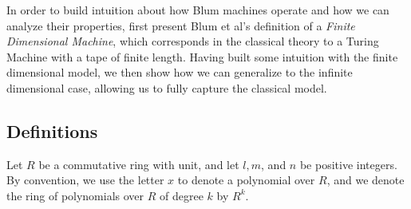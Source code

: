 \documentclass[twoside]{article}
\begin{document}
In order to build intuition about how Blum machines operate and how we
can analyze their properties, first present Blum et al's definition of
a \emph{Finite Dimensional Machine}, which corresponds in the
classical theory to a Turing Machine with a tape of finite length.
Having built some intuition with the finite dimensional model, we then
show how we can generalize to the infinite dimensional case, allowing
us to fully capture the classical model. 

\subsection*{Definitions}

Let $R$ be a commutative ring with unit, and let $l, m$, and $n$ be positive
integers. By convention, we use the letter $x$ to denote a polynomial
over $R$, and we denote the ring of polynomials over $R$ of degree $k$
by $R^k$.
\end{document}
